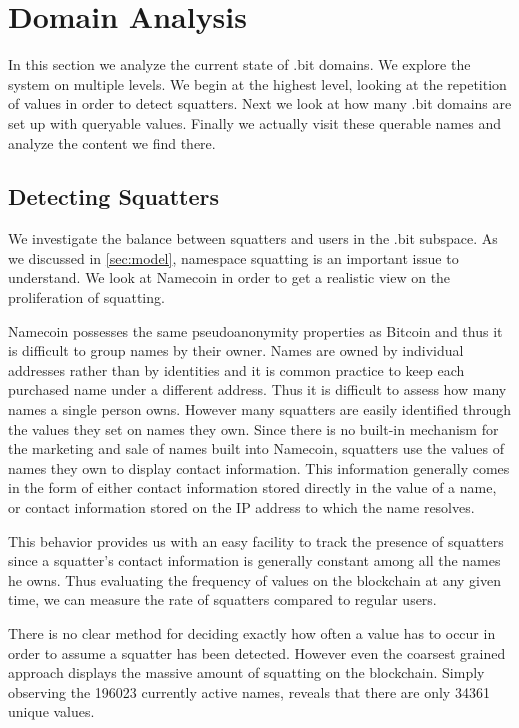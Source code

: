 \section{Domain Analysis}

In this section we analyze the current state of .bit domains. We explore the system on multiple levels. We begin at the highest level, looking at the repetition of values in order to detect squatters. Next we look at how many .bit domains are set up with queryable values. Finally we actually visit these querable names and analyze the content we find there.

\subsection{Detecting Squatters}

We investigate the balance between squatters and users in the .bit subspace. As we discussed in \ref{sec:model}, namespace squatting is an important issue to understand. We look at Namecoin in order to get a realistic view on the proliferation of squatting.

Namecoin possesses the same pseudoanonymity properties as Bitcoin and thus it is difficult to group names by their owner. Names are owned by individual addresses rather than by identities and it is common practice to keep each purchased name under a different address. Thus it is difficult to assess how many names a single person owns. However many squatters are easily identified through the values they set on names they own. Since there is no built-in mechanism for the marketing and sale of names built into Namecoin, squatters use the values of names they own to display contact information. This information generally comes in the form of either contact information stored directly in the value of a name, or contact information stored on the IP address to which the name resolves.

This behavior provides us with an easy facility to track the presence of squatters since a squatter's contact information is generally constant among all the names he owns. Thus evaluating the frequency of values on the blockchain at any given time, we can measure the rate of squatters compared to regular users.

There is no clear method for deciding exactly how often a value has to occur in order to assume a squatter has been detected. However even the coarsest grained approach displays the massive amount of squatting on the blockchain. Simply observing the 196023 currently active names, reveals that there are only 34361 unique values.

